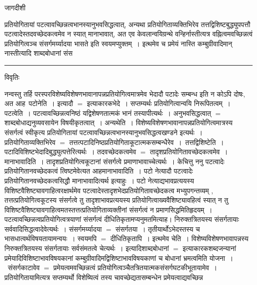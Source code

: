 \documentclass[10pt, openany]{book}
\begin{document}
{\newpage
\begin{center} जागदीशी \end{center}
{\la प्रतियोगितायां पटत्वावच्छिन्नत्वभानस्यानुभवसिद्धत्वात्, अन्यथा प्रतियोगिताव्यक्तिभिरेव तत्तद्विशिष्टबुद्ध्युपपत्तौ पटत्वादेस्तदवच्छेदकत्वमेव न स्यात् मानाभावात्, अत एव केवलान्वयिग्रन्थे वन्हिर्नास्तीत्यत्र वह्नित्वमवच्छिन्नत्वं प्रतियोगित्वञ्च संसर्गमर्य्यादया भासते इति स्वयमप्युक्तम्~। इत्थमेव च प्रमेयं नास्ति कम्बुग्रीवादिमान् नास्तीत्यादि शाब्दबोधानां संस }\\
\hrule
\begin{center}     विवृतिः \end{center}
नन्वस्तु तर्हि परस्परविशेष्यविशेषणभावानापन्नप्रतियोगित्वमात्रमेव भेदादौ पटादेः सम्बन्ध इति न कोऽपि दोषः, अत आह\textendash\ {\la पटोनेति~।} इत्यादौ $=$ इत्याकारकभेदे~। सप्तम्यर्थः प्रतियोगित्वान्वयि निरूपितत्वम्~। पटत्वेति~। पटत्वावच्छिन्नत्वनिष्ठं यद्विशेषणतात्मकं भानं तस्यापीत्यर्थः~। अनुभवसिद्धत्वात्  $=$ 
शाब्दबोधाद्यनुव्यवसायेन विषयीकृतत्वात्~। अन्यथेति~। विशेष्यविशेषणभावानापन्नप्रतियोगित्वमात्रस्य संसर्गत्वं स्वीकृत्य प्रतियोगितायां पटत्वावच्छिन्नत्वभानस्यानुभवसिद्धत्वखण्डने इत्यर्थः~। प्रतियोगिताव्यक्तिभिरेव $=$ तत्तत्पटादिनिष्ठप्रतियोगिताकूटात्मकसम्बन्धैरेव~।~{\la तत्तद्विशिष्टेति~।}
पटादिविशिष्टभेदादिबुद्ध्युत्पत्तेरित्यर्थः~। तदवच्छेदकत्वमेव $=$ तादृशप्रतियोगितावच्छेदकत्वमेव~। मानाभावादिति~। तादृशप्रतियोगित्वकूटानां संसर्गत्वे प्रमाणाभावाच्चेत्यर्थः~। {\la केचित्तु} ननु पटत्वादेः प्रतियोगितानवच्छेदकत्वं त्विष्टमेवेत्यत आह\textendash मानाभावादिति~। पटो नेत्यादौ पटत्वादेः प्रतियोगितानवच्छेदकत्वसिद्धौ मानाभावादित्यर्थ इत्याहुः~। पटो नेत्याद्यभावप्रत्ययस्य विशिष्टवैशिष्ट्यावगाहित्वरक्षार्थमेव पटत्वादेस्तादृशभेदप्रतियोगितावच्छेदकत्व मभ्युपगन्तव्यम् , तत्तत्प्रतियोगित्वकूटस्य संसर्गत्वे तु तादृशाभावप्रत्ययस्य प्रतियोगित्वाख्यवैशिष्ट्यावहित्वं स्यात् न तु विशिष्टवैशिष्ट्यावगाहित्वमतस्तत्तत्प्रतियोगिताव्यक्तीनां संसर्गत्वं न प्रमाणसिद्धमितिहृदयम्~। पटत्वावच्छिन्नत्वप्रतियोगित्वत्रयाणां संसर्गत्वं दीधितिकृतामप्यनुमतमित्याह। निरुक्तत्रितयस्य संसर्गतायाः सर्ववादिसिद्धत्वादेवेत्यर्थः~। संसर्गमर्य्यादया $=$ संसर्गतया~। तृतीयार्थोऽभेदस्तस्य च भासधात्वर्थविषयतायामन्वयः~। स्वयमपि $=$ दीधितिकृतापि~। इत्थमेव चेति~। विशेष्यविशेषणभावापन्नस्य निरुक्तत्रितयस्य संसर्गतायाः सर्वसंमतत्वे चेत्यर्थः~। इत्यादिशाब्दबोधानां $=$ इत्याकारकशब्दजन्यानां प्रमेयादिविशिष्टाभावविषयकानां कम्बुग्रीवादिमद्विशिष्टाभावविषयकाणां च बोधानां भ्रमत्वमिति योजना~।~संसर्गकाटावेव $=$ प्रमेयत्वमवच्छिन्नत्वं प्रतियोगित्वञ्चैतत्रितयात्मकसंसर्गघटकीभूतायामेव~।
प्रतियोगितायामित्यत्र सप्तम्यर्थो विशेष्यित्वं तस्य चावच्छेद्यतासम्बन्धेन प्रमेयत्वाद्यवच्छिन्न
}
\end{document}

